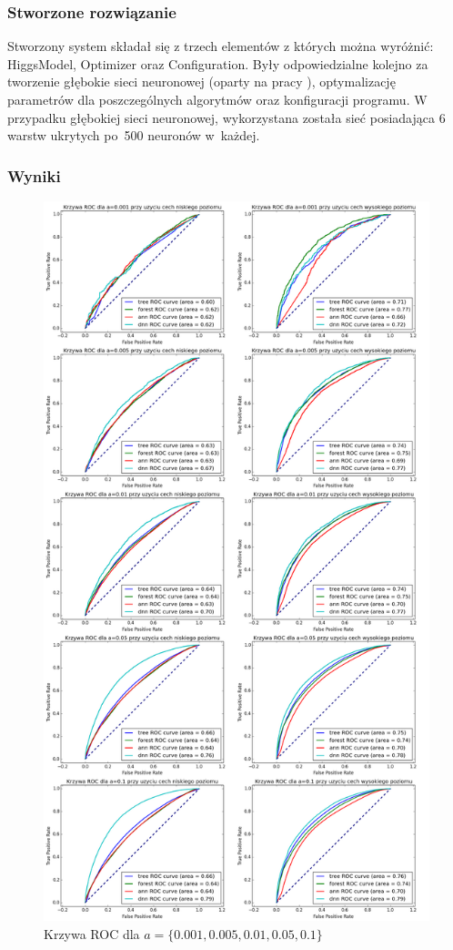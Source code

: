 \subsubsection{Stworzone rozwiązanie}
Stworzony system składał się z trzech elementów z których można wyróżnić: HiggsModel, Optimizer oraz Configuration. Były odpowiedzialne kolejno za tworzenie głębokie sieci neuronowej (oparty na pracy \cite{higgs2}), optymalizację parametrów dla poszczególnych algorytmów oraz konfiguracji programu. W przypadku głębokiej sieci neuronowej, wykorzystana została sieć posiadająca 6 warstw ukrytych po~500 neuronów w~każdej. 


\subsubsection{Wyniki}
\begin{figure}[ht!]
\centering
\includegraphics[scale=0.3]{res/all1.png}
\caption[Caption for LOF]{Krzywa ROC dla $a=\{0.001, 0.005, 0.01, 0.05, 0.1\}$\label{higgsall1}}
\end{figure} 

